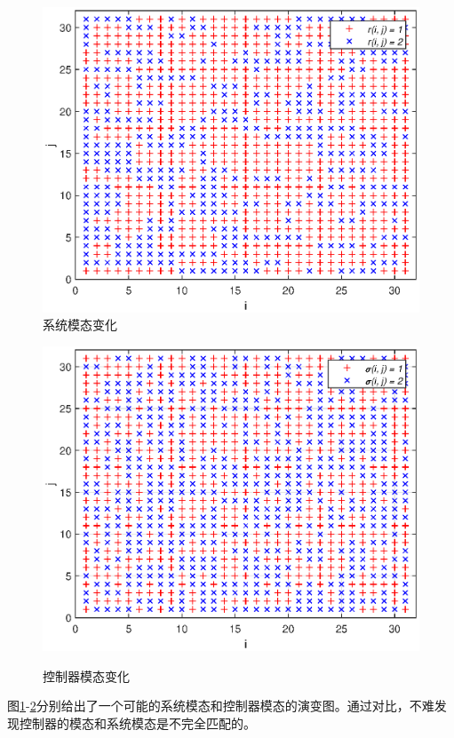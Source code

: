 	\begin{figure}[!htb]
		\centering\includegraphics[scale=0.6]{./figures/2dsmc/simulations/r_eps.eps}
		\caption{系统模态变化}
		\label{fig1}
	\end{figure}
	\begin{figure}[!htb]
		\centering\includegraphics[scale=0.6]{./figures/2dsmc/simulations/sigma_eps.eps}\\ 
		\caption{控制器模态变化}
		\label{fig2}
	\end{figure}
	图\ref{fig1}-\ref{fig2}分别给出了一个可能的系统模态和控制器模态的演变图。通过对比，不难发现控制器的模态和系统模态是不完全匹配的。\\
